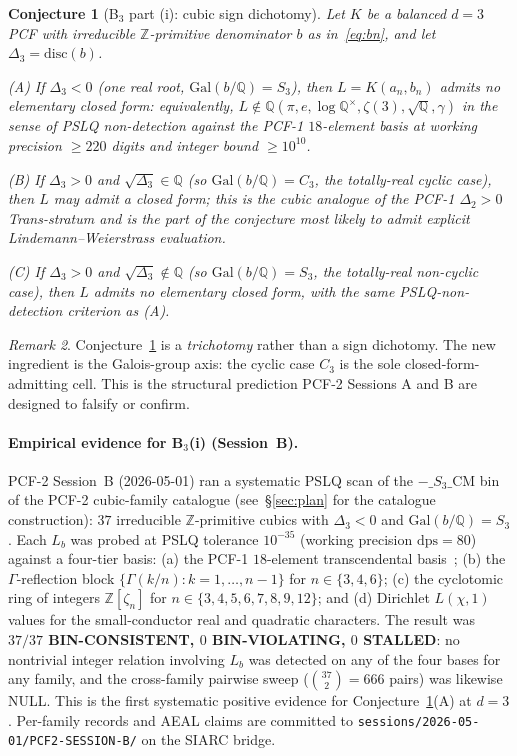 \documentclass[11pt,a4paper]{article}
\newtheorem{conjecture}{Conjecture}
\theoremstyle{definition}
\theoremstyle{remark}
\newtheorem{remark}[conjecture]{Remark}
\newcommand{\Q}{\mathbb{Q}}
\newcommand{\Z}{\mathbb{Z}}
\newcommand{\disc}{\mathrm{disc}}
\newcommand{\Gal}{\mathrm{Gal}}
\begin{document}
\begin{conjecture}[B$_{3}$ part (i): cubic sign dichotomy]\label{conj:B1}
Let $K$ be a balanced $d=3$ PCF with irreducible $\Z$-primitive
denominator $b$ as in~\eqref{eq:bn}, and let $\Delta_{3}=\disc(b)$.

\emph{(A)} If $\Delta_{3}<0$ (one real root, $\Gal(b/\Q)=S_{3}$), then
$L=K(a_{n},b_{n})$ admits no elementary closed form: equivalently,
$L\notin\Q(\pi,e,\log\Q^{\times},\zeta(3),\sqrt{\Q},\gamma)$ in the sense
of PSLQ non-detection against the PCF-1 $18$-element basis at working
precision $\ge 220$ digits and integer bound $\ge 10^{10}$.

\emph{(B)} If $\Delta_{3}>0$ \emph{and} $\sqrt{\Delta_{3}}\in\Q$ (so
$\Gal(b/\Q)=C_{3}$, the totally-real cyclic case), then
$L$ \emph{may} admit a closed form; this is the cubic analogue of the
PCF-1 $\Delta_{2}>0$ Trans-stratum and is the part of the conjecture
most likely to admit explicit Lindemann--Weierstrass evaluation.

\emph{(C)} If $\Delta_{3}>0$ \emph{and} $\sqrt{\Delta_{3}}\notin\Q$ (so
$\Gal(b/\Q)=S_{3}$, the totally-real non-cyclic case), then $L$ admits no
elementary closed form, with the same PSLQ-non-detection criterion as
(A).
\end{conjecture}

\begin{remark}\label{rem:trichotomy}
Conjecture~\ref{conj:B1} is a \emph{trichotomy} rather than a sign
dichotomy. The new ingredient is the Galois-group axis: the cyclic case
$C_{3}$ is the sole closed-form-admitting cell. This is the structural
prediction PCF-2 Sessions A and B are designed to falsify or confirm.
\end{remark}

\paragraph{Empirical evidence for B$_3$(i) (Session~B).}
PCF-2 Session~B (2026-05-01) ran a systematic PSLQ scan of the
$-\_S_3\_\mathrm{CM}$ bin of the PCF-2 cubic-family catalogue
(see~\S\ref{sec:plan} for the catalogue construction): $37$ irreducible
$\Z$-primitive cubics with $\Delta_3<0$ and $\Gal(b/\Q)=S_3$. Each
$L_b$ was probed at PSLQ tolerance $10^{-35}$ (working precision
$\mathrm{dps}=80$) against a four-tier basis: (a) the PCF-1
$18$-element transcendental basis~\cite{Papanokechi2026PCF1}; (b) the
$\Gamma$-reflection block $\{\Gamma(k/n):k=1,\dots,n-1\}$ for
$n\in\{3,4,6\}$; (c) the cyclotomic ring of integers
$\Z[\zeta_n]$ for $n\in\{3,4,5,6,7,8,9,12\}$; and (d) Dirichlet
$L(\chi,1)$ values for the small-conductor real and quadratic
characters. The result was \textbf{$37/37$ BIN-CONSISTENT,
$0$ BIN-VIOLATING, $0$ STALLED}: no nontrivial integer relation
involving $L_b$ was detected on any of the four bases for any family,
and the cross-family pairwise sweep
($\binom{37}{2}=666$ pairs) was likewise NULL. This is the first
systematic positive evidence for Conjecture~\ref{conj:B1}(A) at
$d=3$. Per-family records and AEAL claims are committed to
\texttt{sessions/2026-05-01/PCF2-SESSION-B/} on the SIARC bridge.
\end{document}
